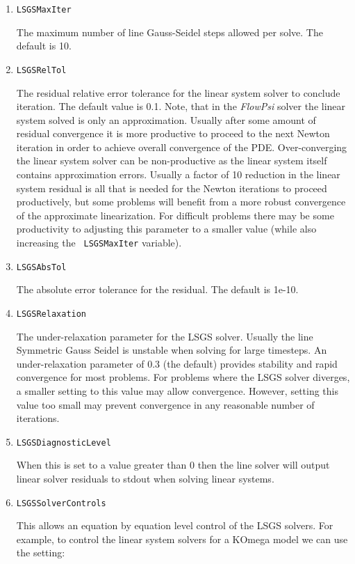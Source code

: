 \documentclass{article}
\begin{document}
\begin{enumerate}
\item {\tt LSGSMaxIter} 

  The maximum number of line Gauss-Seidel steps
  allowed per solve. The default is 10.

\item {\tt LSGSRelTol} 

  The residual relative error tolerance for the linear system solver
  to conclude iteration.  The default value is 0.1.  Note, that in the
  {\em FlowPsi} solver the linear system solved is only an approximation.
  Usually after some amount of residual convergence it is more
  productive to proceed to the next Newton iteration in order to
  achieve overall convergence of the PDE.  Over-converging the linear
  system solver can be non-productive as the linear system itself
  contains approximation errors.  Usually a factor of 10 reduction in
  the linear system residual is all that is needed for the Newton
  iterations to proceed productively, but some problems will benefit
  from a more robust convergence of the approximate linearization.
  For difficult problems there may be some productivity to adjusting
  this parameter to a smaller value (while also increasing the {\tt
    LSGSMaxIter} variable).

\item {\tt LSGSAbsTol}

  The absolute error tolerance for the residual.  The default is 1e-10.

\item {\tt LSGSRelaxation}

  The under-relaxation parameter for the LSGS solver.  Usually the
  line Symmetric Gauss Seidel is unstable when solving for large
  timesteps.  An under-relaxation parameter of 0.3 (the default)
  provides stability and rapid convergence for most problems.  For
  problems where the LSGS solver diverges, a smaller setting to this
  value may allow convergence.  However, setting this value too small
  may prevent convergence in any reasonable number of iterations.

\item {\tt LSGSDiagnosticLevel}

  When this is set to a value greater than 0 then the line solver will
  output linear solver residuals  to stdout when solving linear
  systems.


\item {\tt LSGSSolverControls}

  This allows an equation by equation level control of the LSGS
  solvers.  For example, to control the linear system solvers for a
  KOmega model we can use the setting:


\end{enumerate}
\end{document}
